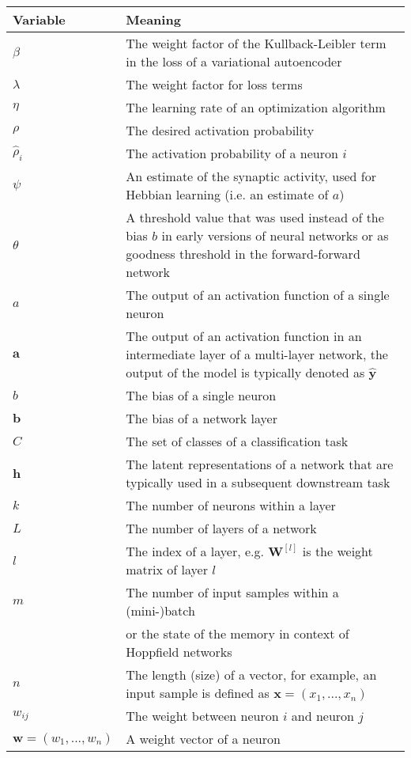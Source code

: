 \begin{tabular}{ p{3cm} p{11cm} }
	\textbf{Variable} & \textbf{Meaning}\\
	\hline
	$\beta$ & The weight factor of the Kullback-Leibler term in the loss of a variational autoencoder\\
	$\lambda$ & The weight factor for loss terms\\
	$\eta$ & The learning rate of an optimization algorithm\\
	$\rho$ & The desired activation probability\\
	$\hat{\rho}_i$ & The activation probability of a neuron $i$\\
	$\psi$ & An estimate of the synaptic activity, used for Hebbian learning (i.e. an estimate of $a$)\\
	$\theta$ & A threshold value that was used instead of the bias $b$ in early versions of neural networks or as goodness threshold in the forward-forward network\\
	$a$ & The output of an activation function of a single neuron\\
	$\boldsymbol{a}$ & The output of an activation function in an intermediate layer of a multi-layer network, the output of the model is typically denoted as $\boldsymbol{\hat{y}}$\\
	$b$ & The bias of a single neuron\\
	$\boldsymbol{b}$ & The bias of a network layer\\
	$C$ & The set of classes of a classification task\\
	$\boldsymbol{h}$ & The latent representations of a network that are typically used in a subsequent downstream task\\
	$k$ & The number of neurons within a layer\\
	$L$ & The number of layers of a network\\
	$l$ & The index of a layer, e.g. $\boldsymbol{W}^{[l]}$ is the weight matrix of layer $l$\\
	$m$ & The number of input samples within a (mini-)batch\\
	    & or the state of the memory in context of Hoppfield networks\\
	$n$ & The length (size) of a vector, for example, an input sample is defined as $\boldsymbol{x} = (x_1, ..., x_n)$\\
	$w_{ij}$ & The weight between neuron $i$ and neuron $j$\\
	$\boldsymbol{w} = (w_1, ..., w_n)$ & A weight vector of a neuron\\

\end{tabular}
